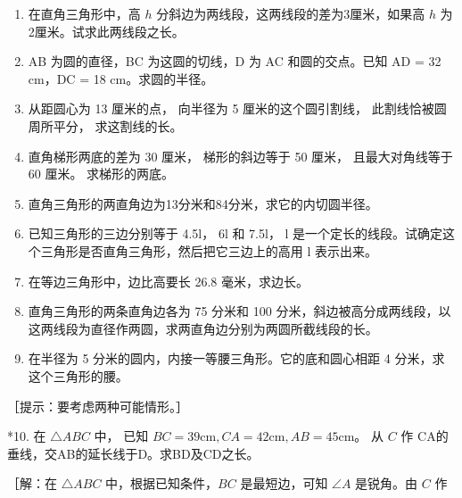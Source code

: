 \begin{enumerate}
\item
  在直角三角形中，高 \(h\) 分斜边为两线段，这两线段的差为3厘米，如果高
  \(h\) 为2厘米。试求此两线段之长。
\item
  AB 为圆的直径，BC 为这圆的切线，D 为 AC 和圆的交点。已知 AD = 32
  cm，DC = 18 cm。求圆的半径。
\item
  从距圆心为 13 厘米的点， 向半径为 5 厘米的这个圆引割线，
  此割线恰被圆周所平分， 求这割线的长。
\item
  直角梯形两底的差为 30 厘米， 梯形的斜边等于 50 厘米， 且最大对角线等于
  60 厘米。 求梯形的两底。
\item
  直角三角形的两直角边为13分米和84分米，求它的内切圆半径。
\item
  已知三角形的三边分别等于 4.5l， 6l 和 7.5l， l
  是一个定长的线段。试确定这个三角形是否直角三角形，然后把它三边上的高用
  l 表示出来。
\item
  在等边三角形中，边比高要长 26.8 毫米，求边长。
\item
  直角三角形的两条直角边各为 75 分米和 100
  分米，斜边被高分成两线段，以这两线段为直径作两圆，求两直角边分别为两圆所截线段的长。
\item
  在半径为 5 分米的圆内，内接一等腰三角形。它的底和圆心相距 4
  分米，求这个三角形的腰。
\end{enumerate}

［提示：要考虑两种可能情形。］

*10. 在 \(\triangle ABC\) 中， 已知
\(BC = 39\mathrm{cm}, CA = 42\mathrm{cm}, AB = 45\mathrm{cm}\)。 从
\(C\) 作 CA的垂线，交AB的延长线于D。求BD及CD之长。

［解：在 \(\triangle ABC\) 中，根据已知条件，\(BC\) 是最短边，可知
\(\angle A\) 是锐角。由 \(C\) 作

